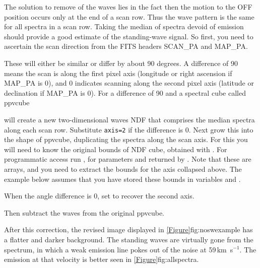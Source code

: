 \documentclass[11pt,oneside,chapters]{starlink}
\newcommand{\kms}{\mbox{$\,$km~s$^{-1}$}}   %
\newcommand{\kms}{\,km~s$^{-1}$}   %
\begin{document}
The solution to remove of the waves lies in the fact then the motion
to the OFF position occurs only at the end of a scan row.  Thus the wave
pattern is the same for all spectra in a scan row.  Taking the median
of spectra devoid of emission should provide a good estimate of the
standing-wave signal.  So first, you need to ascertain the scan direction
from the FITS headers SCAN\_PA and MAP\_PA.

\begin{terminalv}
\end{terminalv}

These will either be similar or differ by about 90 degrees.  A difference of
90 means the scan is along the first pixel axis (longitude or right
ascension if MAP\_PA is 0), and 0 indicates scanning along the second pixel axis
(latitude or declination if MAP\_PA is 0).  For a difference of 90 and a spectral cube
called ppvcube

\begin{terminalv}
\end{terminalv}

will create a new two-dimensional waves NDF that comprises the median
spectra along each scan row.  Substitute \texttt{axis=2} if the difference
is 0.  Next grow this into the shape of ppvcube, duplicating the
spectra along the scan axis.  For this you will need to know the
original bounds of NDF cube, obtained with \ndftrace.  For
programmatic access run , for parameters
 and  returned by \ndftrace.  Note that
these are arrays, and you need to extract the bounds for the axis
collapsed above.  The example below assumes that you have stored these
bounds in variables  and .

\begin{terminalv}
\end{terminalv}

When the angle difference is 0, set  to recover the second
axis.

Then subtract the waves from the original ppvcube.
\begin{terminalv}
\end{terminalv}

After this correction, the revised image displayed in
\cref{Figure}{fig:noswexample}{} has a flatter and darker background.
The standing waves are virtually gone from the spectrum, in which a
weak emission line pokes out of the noise at 59\kms. The emission at
that velocity is better seen in \cref{Figure}{fig:allspectra}{}.
\end{document}

